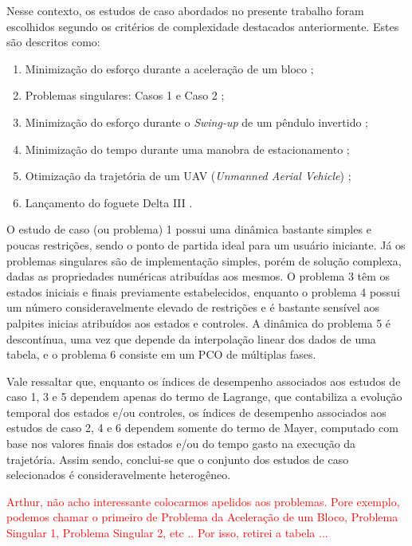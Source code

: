 Nesse contexto, os estudos de caso abordados no presente trabalho foram escolhidos segundo os critérios de complexidade destacados anteriormente. Estes são descritos como:
%
\begin{enumerate}
\item Minimização do esforço durante a aceleração de um bloco \cite{becerra_optimal_2008};
\item Problemas singulares: Casos 1 e Caso 2 \cite{jacobson_computation_1970};
\item Minimização do esforço durante o \textit{Swing-up} de um pêndulo invertido \cite{kelly_introduction_2017};
\item Minimização do tempo durante uma manobra de estacionamento \cite{li_time-optimal_2016};
\item Otimização da trajetória de um UAV (\textit{Unmanned Aerial Vehicle}) \cite{toledo_de_azevedo_pseudospectral_2018};
\item Lançamento do foguete Delta III \cite{benson_gauss_2005}.
\end{enumerate}


O estudo de caso (ou problema) 1 possui uma dinâmica bastante simples e poucas restrições, sendo o ponto de partida ideal para um usuário iniciante. Já os problemas singulares são de implementação simples, porém de solução complexa, dadas as propriedades numéricas atribuídas aos mesmos. O problema 3 têm os estados iniciais e finais previamente estabelecidos, enquanto o problema 4 possui um número consideravelmente elevado de restrições e é bastante sensível aos palpites inicias atribuídos aos estados e controles. A dinâmica do problema 5 é descontínua, uma vez que depende da interpolação linear dos dados de uma tabela, e o problema 6 consiste em um PCO de múltiplas fases. 

Vale ressaltar que, enquanto os índices de desempenho associados aos estudos de caso 1, 3 e 5 dependem apenas do termo de Lagrange, que contabiliza a evolução temporal dos estados e/ou controles, os índices de desempenho associados aos estudos de caso 2, 4 e 6 dependem somente do termo de Mayer, computado com base nos valores finais dos estados e/ou do tempo gasto na execução da trajetória. Assim sendo, conclui-se que o conjunto dos estudos de caso selecionados é consideravelmente heterogêneo. 

\textcolor{red}{Arthur, não acho interessante colocarmos apelidos aos problemas. Pore exemplo, podemos chamar o primeiro de Problema da Aceleração de um Bloco, Problema Singular 1, Problema Singular 2, etc .. Por isso, retirei a tabela ...}

